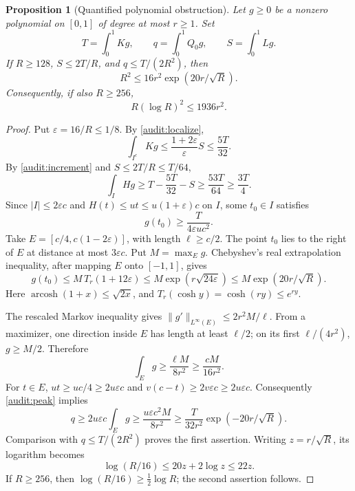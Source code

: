 \documentclass[11pt]{article}
\newtheorem{proposition}{Proposition}
\begin{document}
\begin{proposition}[Quantified polynomial obstruction]
Let $g\ge0$ be a nonzero polynomial on $[0,1]$ of degree at most
$r\ge1$. Set
\[
 T=\int_0^1Kg,\qquad q=\int_0^1Q_0g,\qquad S=\int_0^1Lg.
\]
If $R\ge128$, $S\le2T/R$, and $q\le T/(2R^2)$, then
\[
 R^2\le16r^2\exp(20r/\sqrt R).
\]
Consequently, if also $R\ge256$,
\[
 R(\log R)^2\le1936r^2.
\]
\end{proposition}
\begin{proof}
Put $\varepsilon=16/R\le1/8$. By \eqref{audit:localize},
\[
 \int_{I^c}Kg\le\frac{1+2\varepsilon}{\varepsilon}S
 \le\frac{5T}{32}.
\]
By \eqref{audit:increment} and $S\le2T/R\le T/64$,
\[
 \int_IHg\ge T-\frac{5T}{32}-S\ge\frac{53T}{64}
 \ge\frac{3T}{4}.
\]
Since $|I|\le2\varepsilon c$ and
$H(t)\le ut\le u(1+\varepsilon)c$ on $I$, some $t_0\in I$ satisfies
\begin{equation}
 g(t_0)\ge\frac{T}{4\varepsilon u c^2}.\label{audit:peak}
\end{equation}
Take $E=[c/4,c(1-2\varepsilon)]$, with length $\ell\ge c/2$.
The point $t_0$ lies to the right of $E$ at distance at most
$3\varepsilon c$. Put $M=\max_E g$. Chebyshev's real extrapolation
inequality, after mapping $E$ onto $[-1,1]$, gives
\[
 g(t_0)\le M\,T_r(1+12\varepsilon)
 \le M\exp(r\sqrt{24\varepsilon})
 \le M\exp(20r/\sqrt R).
\]
Here $\operatorname{arcosh}(1+x)\le\sqrt{2x}$, and
$T_r(\cosh y)=\cosh(ry)\le e^{ry}$.

The rescaled Markov inequality gives
$\|g'\|_{L^\infty(E)}\le2r^2M/\ell$.
From a maximizer, one direction inside $E$ has length at least
$\ell/2$; on its first $\ell/(4r^2)$, $g\ge M/2$. Therefore
\[
 \int_Eg\ge\frac{\ell M}{8r^2}\ge\frac{cM}{16r^2}.
\]
For $t\in E$,
$ut\ge uc/4\ge2u\varepsilon c$ and
$v(c-t)\ge2v\varepsilon c\ge2u\varepsilon c$.
Consequently \eqref{audit:peak} implies
\[
 q\ge2u\varepsilon c\int_Eg
 \ge\frac{u\varepsilon c^2M}{8r^2}
 \ge\frac{T}{32r^2}\exp(-20r/\sqrt R).
\]
Comparison with $q\le T/(2R^2)$ proves the first assertion.
Writing $z=r/\sqrt R$, its logarithm becomes
\[
 \log(R/16)\le20z+2\log z\le22z.
\]
If $R\ge256$, then $\log(R/16)\ge\tfrac12\log R$;
the second assertion follows.
\end{proof}
\end{document}
